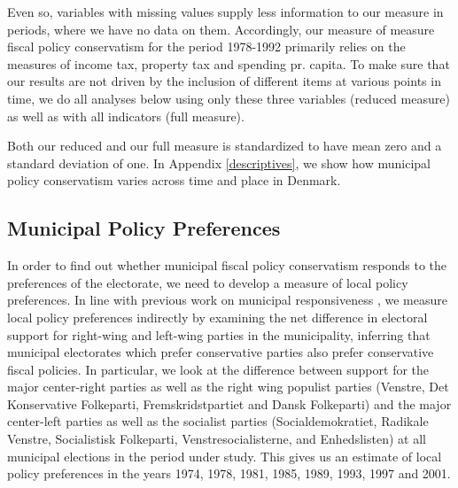 \documentclass[a4paper,12pt]{article}
\begin{document}
Even so, variables with missing values supply less information to our measure in periods, where we have no data on them. Accordingly, our measure of measure fiscal policy conservatism for the period 1978-1992 primarily relies on the measures of income tax, property tax and spending pr. capita. To make sure that our results are not driven by the inclusion of different items at various points in time, we do all analyses below using only these three variables (reduced measure) as well as with all indicators (full measure).

Both our reduced and our full measure is standardized to have mean zero and a standard deviation of one. In Appendix \ref{descriptives}, we show how municipal policy conservatism varies across time and place in Denmark.



\subsection*{Municipal Policy Preferences}

In order to find out whether municipal fiscal policy conservatism responds to the preferences of the electorate, we need to develop a measure of local policy preferences. In line with previous work on municipal responsiveness \cite[e.g.,][]{sances2017ideology,einstein2016pushing}, we measure local policy preferences indirectly by examining the net difference in electoral support for right-wing and left-wing parties in the municipality, inferring that municipal electorates which prefer conservative parties also prefer conservative fiscal policies. In particular, we look at the difference between support for the major center-right parties as well as the right wing populist parties (Venstre, Det Konservative Folkeparti, Fremskridstpartiet and Dansk Folkeparti) and the major center-left parties as well as the socialist parties (Socialdemokratiet, Radikale Venstre, Socialistisk Folkeparti, Venstresocialisterne, and Enhedslisten) at all municipal elections in the period under study. This gives us an estimate of local policy preferences in the years 1974, 1978, 1981, 1985, 1989, 1993, 1997 and 2001.
\end{document}
